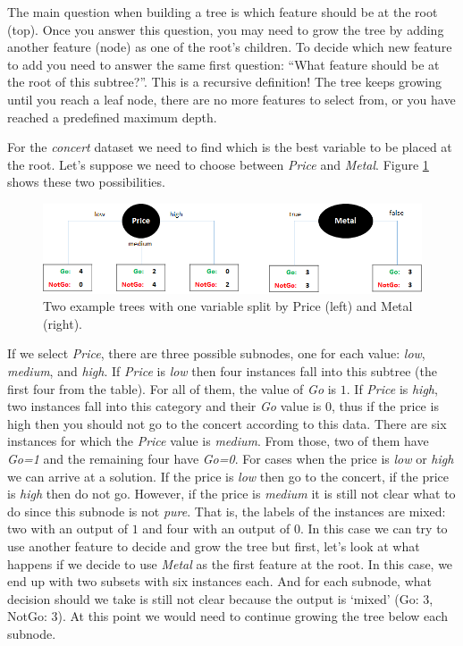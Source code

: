 \documentclass[
  11pt,
]{krantz}
\begin{document}
The main question when building a tree is which feature should be at the root (top). Once you answer this question, you may need to grow the tree by adding another feature (node) as one of the root's children. To decide which new feature to add you need to answer the same first question: ``What feature should be at the root of this subtree?''. This is a recursive definition! The tree keeps growing until you reach a leaf node, there are no more features to select from, or you have reached a predefined maximum depth.

For the \emph{concert} dataset we need to find which is the best variable to be placed at the root. Let's suppose we need to choose between \emph{Price} and \emph{Metal}. Figure \ref{fig:treeAlgo1} shows these two possibilities.

\begin{figure}

{\centering \includegraphics[width=1\linewidth]{images/treeAlgo1} 

}

\caption{Two example trees with one variable split by Price (left) and Metal (right).}\label{fig:treeAlgo1}
\end{figure}

If we select \emph{Price}, there are three possible subnodes, one for each value: \emph{low}, \emph{medium}, and \emph{high}. If \emph{Price} is \emph{low} then four instances fall into this subtree (the first four from the table). For all of them, the value of \emph{Go} is \(1\). If \emph{Price} is \emph{high}, two instances fall into this category and their \emph{Go} value is \(0\), thus if the price is high then you should not go to the concert according to this data. There are six instances for which the \emph{Price} value is \emph{medium}. From those, two of them have \emph{Go=1} and the remaining four have \emph{Go=0}. For cases when the price is \emph{low} or \emph{high} we can arrive at a solution. If the price is \emph{low} then go to the concert, if the price is \emph{high} then do not go. However, if the price is \emph{medium} it is still not clear what to do since this subnode is not \emph{pure}. That is, the labels of the instances are mixed: two with an output of \(1\) and four with an output of \(0\). In this case we can try to use another feature to decide and grow the tree but first, let's look at what happens if we decide to use \emph{Metal} as the first feature at the root. In this case, we end up with two subsets with six instances each. And for each subnode, what decision should we take is still not clear because the output is `mixed' (Go: 3, NotGo: 3). At this point we would need to continue growing the tree below each subnode.
\end{document}
